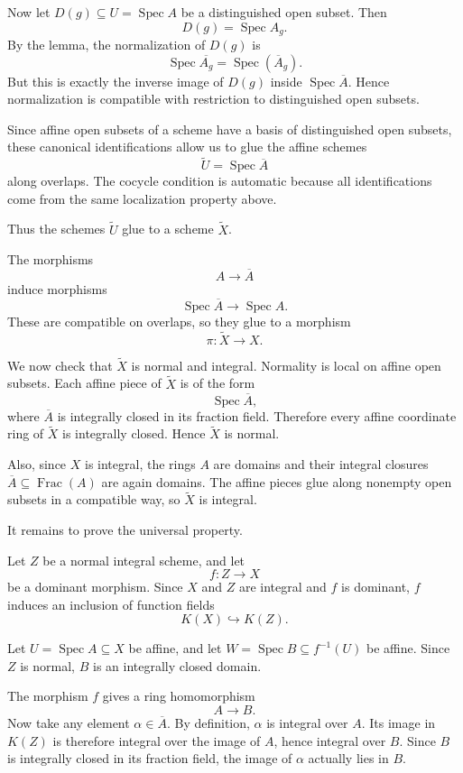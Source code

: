\medskip

Now let \(D(g)\subseteq U=\operatorname{Spec}A\) be a distinguished open
subset. Then
\[
D(g)=\operatorname{Spec}A_g.
\]
By the lemma, the normalization of \(D(g)\) is
\[
\operatorname{Spec}\overline{A_g}
=
\operatorname{Spec}(\overline{A}_g).
\]
But this is exactly the inverse image of \(D(g)\) inside
\(\operatorname{Spec}\overline{A}\). Hence normalization is compatible
with restriction to distinguished open subsets.

Since affine open subsets of a scheme have a basis of distinguished
open subsets, these canonical identifications allow us to glue the affine
schemes
\[
\widetilde{U}=\operatorname{Spec}\overline{A}
\]
along overlaps. The cocycle condition is automatic because all
identifications come from the same localization property above.

Thus the schemes \(\widetilde{U}\) glue to a scheme \(\widetilde{X}\).

The morphisms
\[
A\longrightarrow \overline{A}
\]
induce morphisms
\[
\operatorname{Spec}\overline{A}\longrightarrow \operatorname{Spec}A.
\]
These are compatible on overlaps, so they glue to a morphism
\[
\pi:\widetilde{X}\longrightarrow X.
\]

We now check that \(\widetilde{X}\) is normal and integral. Normality is
local on affine open subsets. Each affine piece of \(\widetilde{X}\) is
of the form
\[
\operatorname{Spec}\overline{A},
\]
where \(\overline{A}\) is integrally closed in its fraction field.
Therefore every affine coordinate ring of \(\widetilde{X}\) is integrally
closed. Hence \(\widetilde{X}\) is normal.

Also, since \(X\) is integral, the rings \(A\) are domains and their
integral closures \(\overline{A}\subseteq \operatorname{Frac}(A)\) are
again domains. The affine pieces glue along nonempty open subsets in a
compatible way, so \(\widetilde{X}\) is integral.

It remains to prove the universal property.

Let \(Z\) be a normal integral scheme, and let
\[
f:Z\longrightarrow X
\]
be a dominant morphism. Since \(X\) and \(Z\) are integral and \(f\) is
dominant, \(f\) induces an inclusion of function fields
\[
K(X)\hookrightarrow K(Z).
\]

Let \(U=\operatorname{Spec}A\subseteq X\) be affine, and let
\(W=\operatorname{Spec}B\subseteq f^{-1}(U)\) be affine. Since \(Z\) is
normal, \(B\) is an integrally closed domain.

The morphism \(f\) gives a ring homomorphism
\[
A\longrightarrow B.
\]
Now take any element \(\alpha\in \overline{A}\). By definition,
\(\alpha\) is integral over \(A\). Its image in \(K(Z)\) is therefore
integral over the image of \(A\), hence integral over \(B\). Since \(B\)
is integrally closed in its fraction field, the image of \(\alpha\)
actually lies in \(B\).

